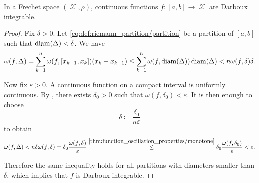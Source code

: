 \begin{proposition}\label{thm:countinuous_functions_integrable}
  In a \hyperref[def:frechet_space]{Frechet space} \( (\mscrX, \rho) \), \hyperref[def:global_continuity]{continuous functions} \( f: [a, b] \to \mscrX \) are \hyperref[def:darboux_integrability]{Darboux integrable}.
\end{proposition}
\begin{proof}
  Fix \( \delta > 0 \). Let \eqref{eq:def:riemann_partition/partition} be a partition of \( [a, b] \) such that \( \operatorname{diam}(\Delta) < \delta \). We have
  \begin{equation*}
    \omega(f, \Delta)
    =
    \sum_{k=1}^n \omega(f, [x_{k-1}, x_k]) (x_k - x_{k-1})
    \leq
    \sum_{k=1}^n \omega(f, \operatorname{diam}(\Delta)) \operatorname{diam}(\Delta)
    <
    n \omega(f, \delta) \delta.
  \end{equation*}

  Now fix \( \varepsilon > 0 \). A continuous function on a compact interval is \hyperref[def:uniform_continuity]{uniformly continuous}. By , there exists \( \delta_0 > 0 \) such that \( \omega(f, \delta_0) < \varepsilon \). It is then enough to choose
  \begin{equation*}
    \delta \coloneqq \frac {\delta_0} {n \varepsilon}
  \end{equation*}
  to obtain
  \begin{equation*}
    \omega(f, \Delta)
    <
    n \delta \omega(f, \delta)
    =
    \delta_0 \frac {\omega(f, \delta)} {\varepsilon}
    \overset {\ref{thm:function_oscillation_properties/monotone}} \leq
    \delta_0 \frac {\omega(f, \delta_0)} {\varepsilon}
    <
    \varepsilon.
  \end{equation*}

  Therefore the same inequality holds for all partitions with diameters smaller than \( \delta \), which implies that \( f \) is Darboux integrable.
\end{proof}


